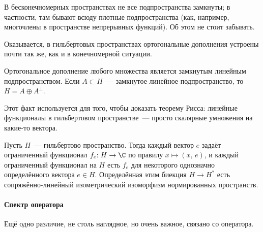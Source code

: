 \documentclass{trlnotes}
\begin{document}
    \begin{rem}
        В бесконечномерных пространствах не все подпространства замкнуты; в частности, там бывают всюду плотные подпространства (как, например, многочлены в пространстве непрерывных функций). Об этом не стоит забывать.
    \end{rem}

    Оказывается, в гильбертовых пространствах ортогональные дополнения устроены почти так же, как и в конечномерной ситуации.

    \begin{st}\label{st:hilb-orth-compl}
        Ортогональное дополнение любого множества является замкнутым линейным подпространством. Если $A \subset H$~--- замкнутое линейное подпространство, то $H = A \oplus A^{\perp}$.
    \end{st}

    Этот факт используется для того, чтобы доказать теорему Рисса: линейные функционалы в гильбертовом пространстве~--- просто скалярные умножения на какие-то вектора.

    \begin{thm}[Рисс]\label{thm:rietz-repr}
        Пусть $H$~--- гильбертово пространство. Тогда каждый вектор $e$ задаёт ограниченный функционал $f_e \col \; H \to \C$ по правилу $x \mapsto (x, \, e)$, и каждый ограниченный функционал на $H$ есть $f_e$ для некоторого однозначно определённого вектора $e \in H$. Определённая этим биекция $H \to H^{*}$ есть сопряжённо-линейный изометрический изоморфизм нормированных пространств.
    \end{thm}

    \paragraph{Спектр оператора}

    Ещё одно различие, не столь наглядное, но очень важное, связано со  оператора.
\end{document}

